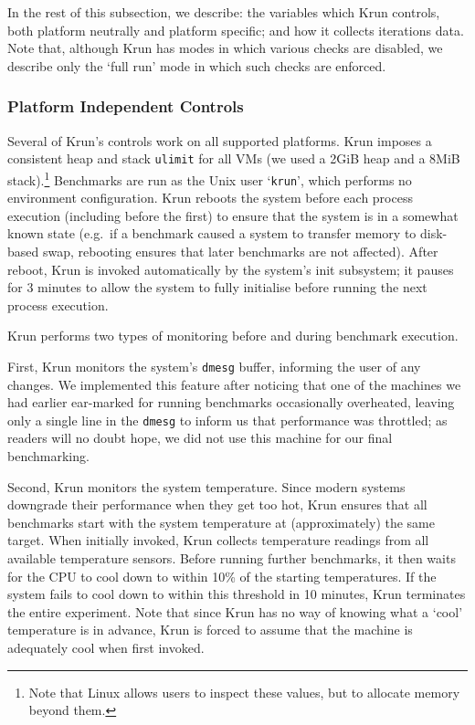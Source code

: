 \documentclass[a4paper,UKenglish]{lipics}
\newcommand{\krun}{Krun\xspace}
\begin{document}
In the rest
of this subsection, we describe: the variables which \krun controls, both
platform neutrally and platform specific; and how it collects iterations data.
Note that, although \krun has modes in which various checks are disabled, we
describe only the `full run' mode in which such checks are enforced.


\subsubsection{Platform Independent Controls}

Several of \krun's controls work on all supported platforms. \krun imposes a
consistent heap and stack \texttt{ulimit} for all
VMs (we used a 2GiB heap and a 8MiB stack).\footnote{Note that Linux allows users
to inspect these values, but to allocate memory beyond them.} Benchmarks are run
as the Unix user `\texttt{krun}', which performs no environment configuration.
\krun reboots the system before each process execution (including
before the first) to ensure that the system is in a somewhat known state
(e.g.~if a benchmark caused a system to transfer memory to disk-based swap,
rebooting ensures that later benchmarks are not affected). After reboot, \krun
is invoked automatically by the system's init subsystem; it pauses for 3 minutes to allow the system
to fully initialise before running the next process execution.

\krun performs two types of monitoring before and during benchmark execution.

First, \krun monitors the system's \texttt{dmesg} buffer, informing the user of
any changes. We implemented this feature after noticing that one of the
machines we had earlier ear-marked for running benchmarks occasionally
overheated, leaving only a single line in the \texttt{dmesg} to inform us that
performance was throttled; as
readers will no doubt hope, we did not use this machine for our final
benchmarking.

Second, \krun monitors the system temperature. Since modern systems downgrade
their performance when they get too hot, \krun ensures that all benchmarks
start with the system temperature at (approximately) the same target. When
initially invoked, \krun collects temperature readings from all available
temperature sensors. Before running
further benchmarks, it then waits for the CPU to cool down to within 10\%{} of
the starting temperatures. If the system fails to cool down to within
this threshold in 10 minutes, \krun terminates the entire experiment. Note that
since \krun has no way of knowing what a `cool' temperature is in advance,
\krun is forced to assume that the machine is adequately cool when first invoked.
\end{document}
